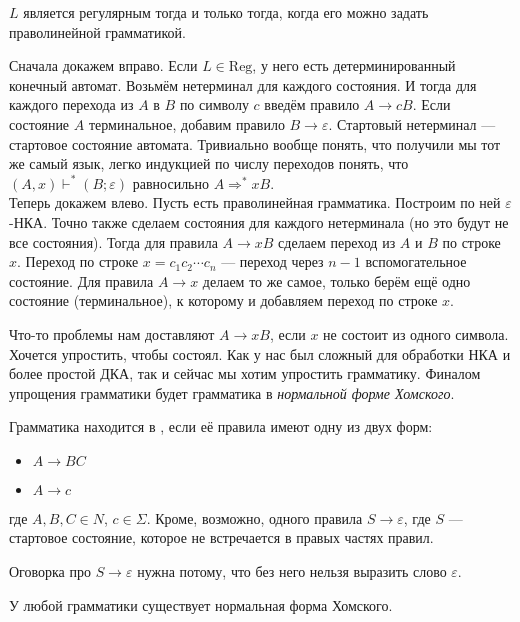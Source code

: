 \documentclass{article}
\begin{document}
\begin{itemize}
        \thm $L$ является регулярным тогда и только тогда, когда его можно задать праволинейной грамматикой.
        \begin{Proof}
            Сначала докажем вправо. Если $L\in\mathrm{Reg}$, у него есть детерминированный конечный автомат. Возьмём нетерминал для каждого состояния. И тогда для каждого перехода из $A$ в $B$ по символу $c$ введём правило $A\to cB$. Если состояние $A$ терминальное, добавим правило $B\to\varepsilon$. Стартовый нетерминал --- стартовое состояние автомата. Тривиально вообще понять, что получили мы тот же самый язык, легко индукцией по числу переходов понять, что $(A,x)\vdash^*(B;\varepsilon)$ равносильно $A\Rightarrow^*xB$.\\
            Теперь докажем влево. Пусть есть праволинейная грамматика. Построим по ней $\varepsilon$-НКА. Точно также сделаем состояния для каждого нетерминала (но это будут не все состояния). Тогда для правила $A\to xB$ сделаем переход из $A$ и $B$ по строке $x$. Переход по строке $x=c_1c_2\cdots c_n$ --- переход через $n-1$ вспомогательное состояние. Для правила $A\to x$ делаем то же самое, только берём ещё одно состояние (терминальное), к которому и добавляем переход по строке $x$.
        \end{Proof}
        \begin{Comment}
            Что-то проблемы нам доставляют $A\to xB$, если $x$ не состоит из одного символа. Хочется упростить, чтобы состоял. Как у нас был сложный для обработки НКА и более простой ДКА, так и сейчас мы хотим упростить грамматику. Финалом упрощения грамматики будет грамматика в \textit{нормальной форме Хомского}.
        \end{Comment}
        \dfn Грамматика находится в , если её правила имеют одну из двух форм:
        \begin{itemize}
            \item $A\to BC$
            \item $A\to c$
        \end{itemize}
        где $A,B,C\in N$, $c\in\Sigma$. Кроме, возможно, одного правила $S\to\varepsilon$, где $S$ --- стартовое состояние, которое не встречается в правых частях правил.
        \begin{Comment}
            Оговорка про $S\to\varepsilon$ нужна потому, что без него нельзя выразить слово $\varepsilon$.
        \end{Comment}
        \thm У любой грамматики существует нормальная форма Хомского.
        \begin{Comment}

\end{Comment}
\end{itemize}
\end{document}
